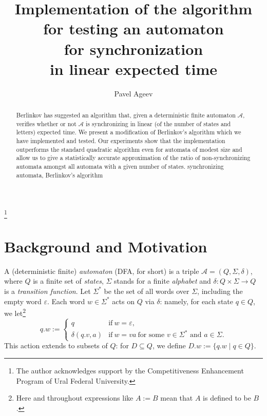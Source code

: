 \documentclass{jalc}
\begin{document}
\title{Implementation of the algorithm \\ for testing an automaton \\ for synchronization \\ in linear expected time}
\thanks{The author acknowledges support by the Competitiveness Enhancement Program of Ural Federal University.}


\author{Pavel Ageev}
\address{Institute of Natural Sciences and Mathematics\\
Ural Federal University, Lenina 51, 620000 Yekaterinburg, Russia,\\
}

\maketitle
\begin{abstract}
Berlinkov has suggested an algorithm that, given a deterministic finite automaton $\mathcal{A}$, verifies whether or not $\mathcal{A}$ is synchronizing in linear (of the number of states and letters) expected time. We present a modification of Berlinkov's algorithm which we have implemented and tested. Our experiments show that the implementation outperforms the standard quadratic algorithm even for automata of modest size and allow us to give a statistically accurate approximation of the ratio of non-synchronizing automata amongst all automata with a given number of states.
\keywords
    synchronizing automata, Berlinkov's algorithm
\end{abstract}

\section{Background and Motivation}

A (deterministic finite) \emph{automaton} (DFA, for short) is a triple $\mathcal{A}=(Q, \Sigma, \delta)$, where $Q$ is a finite set of \emph{states}, $\Sigma$ stands for a finite \emph{alphabet} and $\delta\colon Q\times\Sigma \rightarrow Q$ is a \emph{transition function}. Let $\Sigma^*$ be the set of all words over $\Sigma$, including the empty word $\varepsilon$. Each word $w\in\Sigma^*$ acts on $Q$ via $\delta$: namely, for each state $q\in Q$, we let\footnote{Here and throughout expressions like $A := B$ mean that $A$ is defined to be $B$.}
\[
q.w:=\begin{cases}
q &\text{if}\ w=\varepsilon,\\
\delta(q.v,a) &\text{if}\ w=va\ \text{for some $v\in\Sigma^*$ and $a\in\Sigma$}.
\end{cases}
\]
This action extends to subsets of $Q$: for $D\subseteq Q$, we define $D.w:=\{q.w \mid q \in Q\}$.
\end{document}
